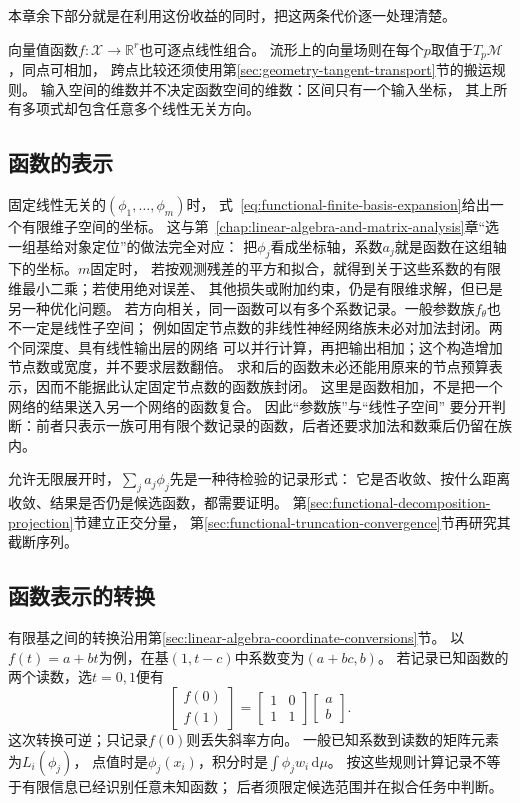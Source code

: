 本章余下部分就是在利用这份收益的同时，把这两条代价逐一处理清楚。



向量值函数$f:\mathcal X\to\mathbb R^r$也可逐点线性组合。
流形上的向量场则在每个$p$取值于$T_p\mathcal M$，同点可相加，
跨点比较还须使用第\ref{sec:geometry-tangent-transport}节的搬运规则。
输入空间的维数并不决定函数空间的维数：区间只有一个输入坐标，
其上所有多项式却包含任意多个线性无关方向。



\subsection{函数的表示}
\label{sec:functional-representations}

固定线性无关的$(\phi_1,\ldots,\phi_m)$时，
式~\eqref{eq:functional-finite-basis-expansion}给出一个有限维子空间的坐标。
这与第~\ref{chap:linear-algebra-and-matrix-analysis}章“选一组基给对象定位”的做法完全对应：
把$\phi_j$看成坐标轴，系数$a_j$就是函数在这组轴下的坐标。$m$固定时，
若按观测残差的平方和拟合，就得到关于这些系数的有限维最小二乘；若使用绝对误差、
其他损失或附加约束，仍是有限维求解，但已是另一种优化问题。
若方向相关，同一函数可以有多个系数记录。一般参数族$f_\theta$也不一定是线性子空间；
例如固定节点数的非线性神经网络族未必对加法封闭。两个同深度、具有线性输出层的网络
可以并行计算，再把输出相加；这个构造增加节点数或宽度，并不要求层数翻倍。
求和后的函数未必还能用原来的节点预算表示，因而不能据此认定固定节点数的函数族封闭。
这里是函数相加，不是把一个网络的结果送入另一个网络的函数复合。
因此“参数族”与“线性子空间”
要分开判断：前者只表示一族可用有限个数记录的函数，后者还要求加法和数乘后仍留在族内。

允许无限展开时，$\sum_j a_j\phi_j$先是一种待检验的记录形式：
它是否收敛、按什么距离收敛、结果是否仍是候选函数，都需要证明。
第\ref{sec:functional-decomposition-projection}节建立正交分量，
第\ref{sec:functional-truncation-convergence}节再研究其截断序列。

\subsection{函数表示的转换}
\label{sec:functional-representation-conversions}

有限基之间的转换沿用第\ref{sec:linear-algebra-coordinate-conversions}节。
以$f(t)=a+bt$为例，在基$(1,t-c)$中系数变为$(a+bc,b)$。
若记录已知函数的两个读数，选$t=0,1$便有
\[
 \begin{bmatrix}f(0)\\f(1)\end{bmatrix}
 =\begin{bmatrix}1&0\\1&1\end{bmatrix}\begin{bmatrix}a\\b\end{bmatrix}.
\]
这次转换可逆；只记录$f(0)$则丢失斜率方向。
一般已知系数到读数的矩阵元素为$L_i(\phi_j)$，
点值时是$\phi_j(x_i)$，积分时是$\int\phi_jw_i\,\mathrm d\mu$。
按这些规则计算记录不等于有限信息已经识别任意未知函数；
后者须限定候选范围并在拟合任务中判断。

